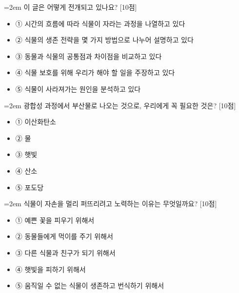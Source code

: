 \documentclass[12pt,a4paper]{article}
\newcommand{\qnum}[1]{%
  \tikz[baseline=(num.base)]{%
    \node[circle, fill=numCircle, text=white, inner sep=0pt,
          minimum size=18pt, font=\small\bfseries] (num) {#1};%
  }%
}
\newcommand{\pts}[1]{%
  \hfill\textcolor{ptsBadge}{[#1점]}%
}
\begin{document}
\vspace{4mm}
\begin{minipage}{\columnwidth}
{\hangindent=2em
\qnum{12}\enspace 이 글은 어떻게 전개되고 있나요? \pts{10}
\par}

\vspace{3mm}
\begin{itemize}[leftmargin=2.5em, labelsep=0.3em, label={}, itemsep=4pt, parsep=1pt, topsep=0pt]
  \item ① 시간의 흐름에 따라 식물이 자라는 과정을 나열하고 있다
  \item ② 식물의 생존 전략을 몇 가지 방법으로 나누어 설명하고 있다
  \item ③ 동물과 식물의 공통점과 차이점을 비교하고 있다
  \item ④ 식물 보호를 위해 우리가 해야 할 일을 주장하고 있다
  \item ⑤ 식물이 사라져가는 원인을 분석하고 있다
\end{itemize}
\end{minipage}
\vspace{4mm}

\vspace{4mm}
\begin{minipage}{\columnwidth}
{\hangindent=2em
\qnum{13}\enspace 광합성 과정에서 부산물로 나오는 것으로, 우리에게 꼭 필요한 것은? \pts{10}
\par}

\vspace{3mm}
\begin{itemize}[leftmargin=2.5em, labelsep=0.3em, label={}, itemsep=4pt, parsep=1pt, topsep=0pt]
  \item ① 이산화탄소
  \item ② 물
  \item ③ 햇빛
  \item ④ 산소
  \item ⑤ 포도당
\end{itemize}
\end{minipage}
\vspace{4mm}

\vspace{4mm}
\begin{minipage}{\columnwidth}
{\hangindent=2em
\qnum{14}\enspace 식물이 자손을 멀리 퍼뜨리려고 노력하는 이유는 무엇일까요? \pts{10}
\par}

\vspace{3mm}
\begin{itemize}[leftmargin=2.5em, labelsep=0.3em, label={}, itemsep=4pt, parsep=1pt, topsep=0pt]
  \item ① 예쁜 꽃을 피우기 위해서
  \item ② 동물들에게 먹이를 주기 위해서
  \item ③ 다른 식물과 친구가 되기 위해서
  \item ④ 햇빛을 피하기 위해서
  \item ⑤ 움직일 수 없는 식물이 생존하고 번식하기 위해서
\end{itemize}
\end{minipage}
\vspace{4mm}
\end{document}
